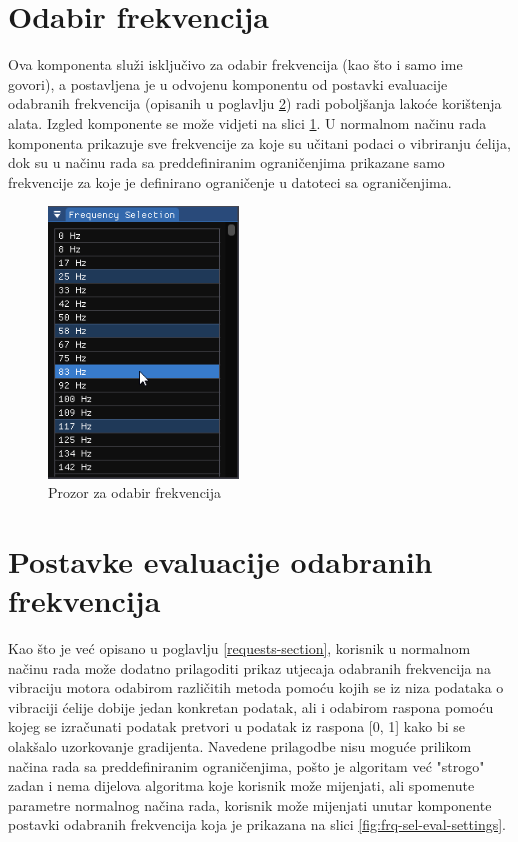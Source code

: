 \documentclass[times, utf8, diplomski]{fer}
\begin{document}
\section{Odabir frekvencija} \label{frequency-selection-section}

Ova komponenta služi isključivo za odabir frekvencija (kao što i samo ime govori), a postavljena je u odvojenu komponentu od postavki evaluacije odabranih frekvencija (opisanih u poglavlju \ref{frequency-settings-section}) radi poboljšanja lakoće korištenja alata. Izgled komponente se može vidjeti na slici \ref{fig:frequency-selection-view}. U normalnom načinu rada komponenta prikazuje sve frekvencije za koje su učitani podaci o vibriranju ćelija, dok su u načinu rada sa preddefiniranim ograničenjima prikazane samo frekvencije za koje je definirano ograničenje u datoteci sa ograničenjima. 

\begin{figure} [H]
	\centering
    \includegraphics[width=0.45\textwidth]{frequency_selection_view.png}
    \caption{Prozor za odabir frekvencija}
    \label{fig:frequency-selection-view}
\end{figure}

\section{Postavke evaluacije odabranih frekvencija} \label{frequency-settings-section}

Kao što je već opisano u poglavlju \ref{requests-section}, korisnik u normalnom načinu rada može dodatno prilagoditi prikaz utjecaja odabranih frekvencija na vibraciju motora odabirom različitih metoda pomoću kojih se iz niza podataka o vibraciji ćelije dobije jedan konkretan podatak, ali i odabirom raspona pomoću kojeg se izračunati podatak pretvori u podatak iz raspona [0, 1] kako bi se olakšalo uzorkovanje gradijenta. Navedene prilagodbe nisu moguće prilikom načina rada sa preddefiniranim ograničenjima, pošto je algoritam već "strogo" zadan i nema dijelova algoritma koje korisnik može mijenjati, ali spomenute parametre normalnog načina rada, korisnik može mijenjati unutar komponente postavki odabranih frekvencija koja je prikazana na slici \ref{fig:frq-sel-eval-settings}.
\end{document}
